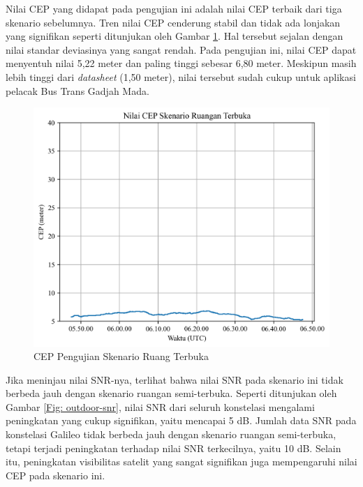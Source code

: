 Nilai CEP yang didapat pada pengujian ini adalah nilai CEP terbaik dari tiga skenario sebelumnya. Tren nilai CEP cenderung stabil dan tidak ada lonjakan yang signifikan seperti ditunjukan oleh Gambar \ref{Fig: outdoor-cep}. Hal tersebut sejalan dengan nilai standar deviasinya yang sangat rendah. Pada pengujian ini, nilai CEP dapat menyentuh nilai 5,22 meter dan paling tinggi sebesar 6,80 meter. Meskipun masih lebih tinggi dari \textit{datasheet} (1,50 meter), nilai tersebut sudah cukup untuk aplikasi pelacak Bus Trans Gadjah Mada.

\begin{figure}[H]
	\centering
	\includegraphics[width=13cm]{contents/chapter-4/4-skenario-outdoor/cep.png}
	\caption{CEP Pengujian Skenario Ruang Terbuka}
	\label{Fig: outdoor-cep}
\end{figure}

Jika meninjau nilai SNR-nya, terlihat bahwa nilai SNR pada skenario ini tidak berbeda jauh dengan skenario ruangan semi-terbuka. Seperti ditunjukan oleh Gambar \ref{Fig: outdoor-snr}, nilai SNR dari seluruh konstelasi mengalami peningkatan yang cukup signifikan, yaitu mencapai 5 dB. Jumlah data SNR pada konstelasi Galileo tidak berbeda jauh dengan skenario ruangan semi-terbuka, tetapi terjadi peningkatan terhadap nilai SNR terkecilnya, yaitu 10 dB. Selain itu, peningkatan visibilitas satelit yang sangat signifikan juga mempengaruhi nilai CEP pada skenario ini. 

